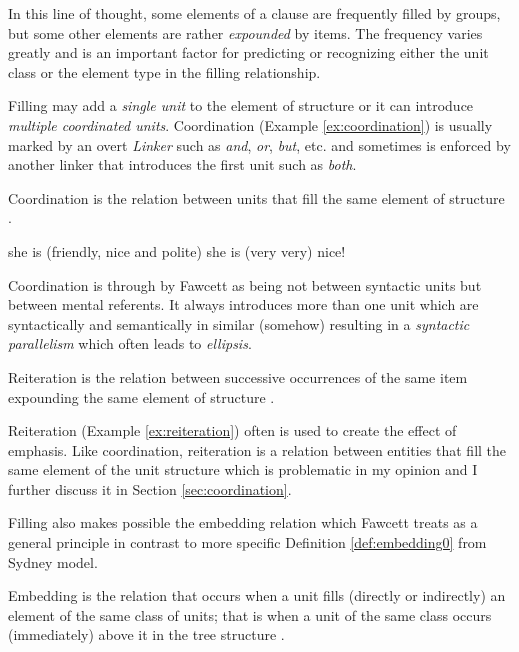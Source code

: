 In this line of thought, some elements of a clause are frequently filled by groups, but some other elements are rather \textit{expounded} by items. The frequency varies greatly and is an important factor for predicting or recognizing either the unit class or the element type in the filling relationship. 

Filling may add a \textit{single unit} to the element of structure or it can introduce \textit{multiple coordinated units}. Coordination (Example \ref{ex:coordination}) is usually marked by an overt \textit{Linker} such as \textit{and}, \textit{or}, \textit{but}, etc. and sometimes is enforced by another linker that introduces the first unit such as \textit{both}.

\begin{definition}[Coordination]\label{def:coordination}
    Coordination is the relation between units that fill the same element of structure \citep[263]{Fawcett2000}. 
\end{definition}

\begin{exe}
    \ex\label{ex:coordination} she is (friendly, nice and polite)
    \ex\label{ex:reiteration} she is (very very) nice!
\end{exe}

Coordination is through by Fawcett as being not between syntactic units but between mental referents. It always introduces more than one unit which are syntactically and semantically in similar (somehow) resulting in a \textit{syntactic parallelism} which often leads to \textit{ellipsis}. 

\begin{definition}[Reiteration]\label{def:reiteration}
    Reiteration is the relation between successive occurrences of the same item expounding the same element of structure  \citep[271]{Fawcett2000}. 
\end{definition}

Reiteration (Example \ref{ex:reiteration}) often is used to create the effect of emphasis. Like coordination, reiteration is a relation between entities that fill the same element of the unit structure which is problematic in my opinion and I further discuss it in Section \ref{sec:coordination}.

Filling also makes possible the embedding relation  which Fawcett treats as a general principle in contrast to more specific Definition \ref{def:embedding0} from Sydney model.

\begin{definition}\label{def:embedding}
    Embedding is the relation that occurs when a unit fills (directly or indirectly) an element of the same class of units; that is when a unit of the same class occurs (immediately) above it in the tree structure \citep[264]{Fawcett2000}. 
\end{definition}

